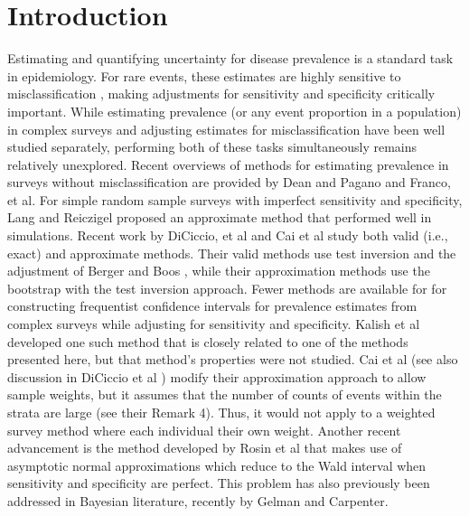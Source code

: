 \documentclass[AMA,STIX1COL]{WileyNJD-v2}
\begin{document}

\section{Introduction}

Estimating and quantifying uncertainty for disease prevalence is a standard task in epidemiology.
For rare events, these estimates are highly sensitive to misclassification \cite{hemenwaySelfDefense}, making adjustments for sensitivity and specificity critically important.
While estimating prevalence (or any event proportion in a population) in complex surveys and adjusting estimates for misclassification have been well studied separately, performing both of these tasks simultaneously remains relatively unexplored.
Recent overviews of methods for estimating prevalence in surveys without misclassification are provided by Dean and Pagano\cite{Dean:2015} and Franco, et al\cite{franco2019}.
For  simple random sample surveys with imperfect sensitivity and specificity, Lang and Reiczigel\cite{Lang:2014} proposed an approximate method that performed well in simulations. Recent work by DiCiccio, et al \cite{DiCi:2021} and Cai et al \cite{Cai:2020} study both valid (i.e., exact) and approximate methods. Their valid methods use test inversion and the adjustment of Berger and Boos \cite{Berg:1994}, while their approximation methods use the bootstrap with the test inversion approach. 
Fewer methods are available for for constructing frequentist confidence intervals for prevalence estimates from complex surveys while adjusting for sensitivity and specificity.
Kalish et al\cite{Kali:2021} developed one such method that is closely related to one of the methods presented here, but that method's properties were not studied.
Cai et al \cite{Cai:2020} (see also discussion in DiCiccio et al \cite{DiCi:2021}) modify their approximation approach to allow sample weights, but it assumes that the number of counts of events within the strata are large (see their Remark 4).  Thus, it would not apply to a weighted survey method where each individual their own weight. 
Another recent advancement is the method developed by Rosin et al \cite{rosin2021estimating} that 
 makes use of asymptotic normal approximations which reduce to the Wald interval when sensitivity and specificity are perfect.
This problem has also previously been addressed in Bayesian literature, recently by Gelman and Carpenter\cite{GelmanBayes}.
\end{document}
